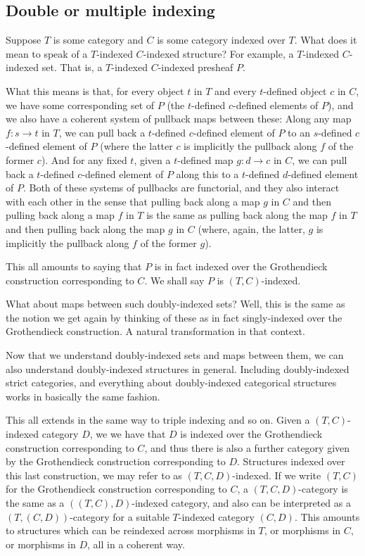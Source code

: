 \subsection{Double or multiple indexing}
Suppose $T$ is some category and $C$ is some category indexed over $T$. What does it mean to speak of a $T$-indexed $C$-indexed structure? For example, a $T$-indexed $C$-indexed set. That is, a $T$-indexed $C$-indexed presheaf $P$.

What this means is that, for every object $t$ in $T$ and every $t$-defined object $c$ in $C$, we have some corresponding set of $P$ (the $t$-defined $c$-defined elements of $P$), and we also have a coherent system of pullback maps between these: Along any map $f : s \to t$ in $T$, we can pull back a $t$-defined $c$-defined element of $P$ to an $s$-defined $c$-defined element of $P$ (where the latter $c$ is implicitly the pullback along $f$ of the former $c$). And for any fixed $t$, given a $t$-defined map $g : d \to c$ in $C$, we can pull back a $t$-defined $c$-defined element of $P$ along this to a $t$-defined $d$-defined element of $P$. Both of these systems of pullbacks are functorial, and they also interact with each other  in the sense that pulling back along a map $g$ in $C$ and then pulling back along a map $f$ in $T$ is the same as pulling back along the map $f$ in $T$ and then pulling back along the map $g$ in $C$ (where, again, the latter, $g$ is implicitly the pullback along $f$ of the former $g$).

This all amounts to saying that $P$ is in fact indexed over the Grothendieck construction corresponding to $C$. We shall say $P$ is $(T, C)$-indexed.

What about maps between such doubly-indexed sets? Well, this is the same as the notion we get again by thinking of these as in fact singly-indexed over the Grothendieck construction. A natural transformation in that context.

Now that we understand doubly-indexed sets and maps between them, we can also understand doubly-indexed structures in general. Including doubly-indexed strict categories, and everything about doubly-indexed categorical structures works in basically the same fashion.

This all extends in the same way to triple indexing and so on. Given a $(T, C)$-indexed category $D$, we we have that $D$ is indexed over the Grothendieck construction corresponding to $C$, and thus there is also a further category given by the Grothendieck construction corresponding to $D$. Structures indexed over this last construction, we may refer to as $(T, C, D)$-indexed. If we write $(T, C)$ for the Grothendieck construction corresponding to $C$, a $(T, C, D)$-category is the same as a $((T, C), D)$-indexed category, and also can be interpreted as a $(T, (C, D))$-category for a suitable $T$-indexed category $(C, D)$. This amounts to structures which can be reindexed across morphisms in $T$, or  morphisms in $C$, or morphisms in $D$, all in a coherent way.

